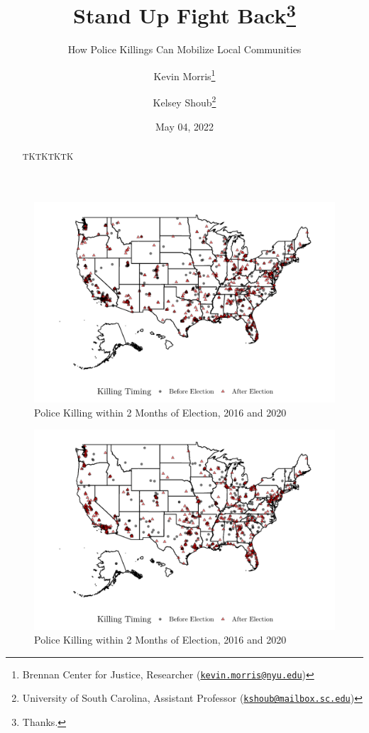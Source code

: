 \documentclass[
  12pt,
]{article}
\title{Stand Up Fight Back\thanks{Thanks.}}
\subtitle{How Police Killings Can Mobilize Local Communities}
\author{Kevin Morris\footnote{Brennan Center for Justice, Researcher (\href{mailto:kevin.morris@nyu.edu}{\nolinkurl{kevin.morris@nyu.edu}})} \and Kelsey Shoub\footnote{University of South Carolina, Assistant Professor (\href{mailto:kshoub@mailbox.sc.edu}{\nolinkurl{kshoub@mailbox.sc.edu}})}}
\date{May 04, 2022}
\begin{document}
\maketitle
\begin{abstract}
TKTKTKTK
\end{abstract}

\pagebreak
\doublespacing


\begin{figure}[h]

{\centering \includegraphics{shoot_to_files/figure-latex/map-1} 

}

\caption{\label{fig:map}Police Killing within 2 Months of Election, 2016 and 2020}\label{fig:map}
\end{figure}

\begin{figure}[h]

{\centering \includegraphics{shoot_to_files/figure-latex/map-16-1} 

}

\caption{\label{fig:map}Police Killing within 2 Months of Election, 2016 and 2020}\label{fig:map-16}
\end{figure}
\end{document}

